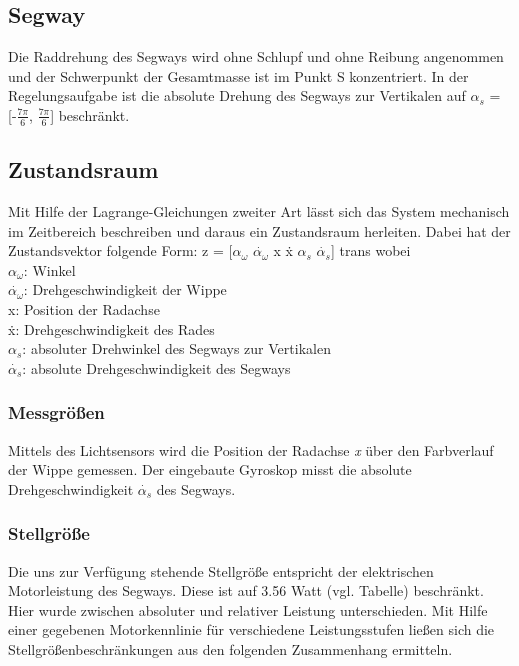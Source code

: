 \documentclass[pdf]{ifacconf}
\begin{document}
	\subsection{Segway}
	Die Raddrehung des Segways wird ohne Schlupf und ohne Reibung angenommen und der 		Schwerpunkt der Gesamtmasse ist im Punkt S konzentriert. 
	In der Regelungsaufgabe ist die absolute Drehung des Segways zur Vertikalen auf 		$\alpha^{}_{s}$ = [-$\frac{7\pi}{6}$, $\frac{7\pi}{6}$] beschränkt. %

	\subsection{Zustandsraum}
	Mit Hilfe der Lagrange-Gleichungen zweiter Art lässt sich das System mechanisch 		im Zeitbereich beschreiben und daraus ein Zustandsraum herleiten.
	Dabei hat der Zustandsvektor folgende Form:
	z = [$\alpha^{}_{\omega}$ $\dot{\alpha^{}_{\omega}}$ x \.{x} $\alpha^{}_{s}$ $\dot{\alpha^{}_{s}}$] trans
	wobei \\
	$\alpha^{}_{\omega}$: Winkel\\
	$\dot{\alpha^{}_{\omega}}$: Drehgeschwindigkeit der Wippe\\
	x:  Position der Radachse\\
	\.{x}:  Drehgeschwindigkeit des Rades\\
	$\alpha^{}_{s}$: absoluter Drehwinkel des Segways zur Vertikalen\\
	$\dot{\alpha^{}_{s}}$: absolute Drehgeschwindigkeit des Segways\\
	
		\subsubsection{Messgrößen}
		Mittels des Lichtsensors wird die Position der Radachse \textit{x} über den 		Farbverlauf der Wippe gemessen. Der eingebaute Gyroskop misst die absolute Drehgeschwindigkeit $\dot{\alpha^{}_{s}}$ des Segways.
		
		\subsubsection{Stellgröße}
		Die uns zur Verfügung stehende Stellgröße entspricht der elektrischen Motorleistung des Segways. Diese ist auf 3.56 Watt (vgl. Tabelle) beschränkt.
		Hier wurde zwischen absoluter und relativer Leistung unterschieden. Mit Hilfe einer gegebenen Motorkennlinie für verschiedene Leistungsstufen ließen sich die Stellgrößenbeschränkungen aus den folgenden Zusammenhang ermitteln.
\end{document}
